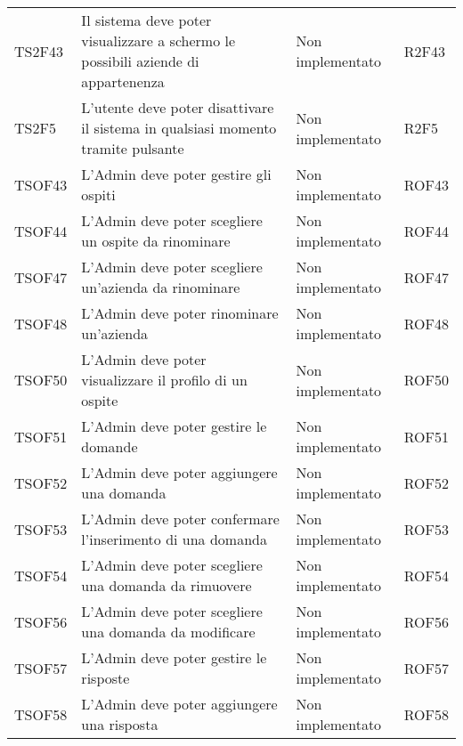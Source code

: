 \documentclass[../PianoDiQualifica.tex]{subfiles}
\begin{document}
\begin{longtable}[c] { >{\centering\arraybackslash}p{2cm} p{7cm} >{\centering\arraybackslash}p{4cm} >{\centering\arraybackslash}p{2cm}}
			\midrule
			\addlinespace[0.3em]
			TS2F43 & Il sistema deve poter visualizzare a schermo le possibili aziende di appartenenza & Non implementato & R2F43 \\ 
			\addlinespace[0.3em]
			\midrule
			\addlinespace[0.3em]
			TS2F5 & L'utente deve poter disattivare il sistema in qualsiasi momento tramite pulsante	 & Non implementato & R2F5 \\ 
			\addlinespace[0.3em]
			\midrule
			\addlinespace[0.3em]
			TSOF43 & L'Admin deve poter gestire gli ospiti & Non implementato & ROF43 \\ 
			\addlinespace[0.3em]
			\midrule
			\addlinespace[0.3em]
			TSOF44 & L'Admin deve poter scegliere un ospite da rinominare & Non implementato & ROF44 \\ 
			\addlinespace[0.3em]
			\midrule
			\addlinespace[0.3em]
			TSOF47 & L'Admin deve poter scegliere un'azienda da rinominare & Non implementato & ROF47 \\ 
			\addlinespace[0.3em]
			\midrule
			\addlinespace[0.3em]
			TSOF48 & L'Admin deve poter rinominare un'azienda & Non implementato & ROF48 \\ 
			\addlinespace[0.3em]
			\midrule
			\addlinespace[0.3em]
			TSOF50 & L'Admin deve poter visualizzare il profilo di un ospite & Non implementato & ROF50 \\ 
			\addlinespace[0.3em]
			\midrule
			\addlinespace[0.3em]
			TSOF51 & L'Admin deve poter gestire le domande & Non implementato & ROF51 \\ 
			\addlinespace[0.3em]
			\midrule
			\addlinespace[0.3em]
			TSOF52 & L'Admin deve poter aggiungere una domanda & Non implementato & ROF52 \\ 
			\addlinespace[0.3em]
			\midrule
			\addlinespace[0.3em]
			TSOF53 & L'Admin deve poter confermare l'inserimento di una domanda & Non implementato & ROF53 \\ 
			\addlinespace[0.3em]
			\midrule
			\addlinespace[0.3em]
			TSOF54 & L'Admin deve poter scegliere una domanda da rimuovere	 & Non implementato & ROF54 \\ 
			\addlinespace[0.3em]
			\midrule
			\addlinespace[0.3em]
			TSOF56 & L'Admin deve poter scegliere una domanda da modificare	 & Non implementato & ROF56 \\ 
			\addlinespace[0.3em]
			\midrule
			\addlinespace[0.3em]
			TSOF57 & L'Admin deve poter gestire le risposte & Non implementato & ROF57 \\
			\addlinespace[0.3em]
			\midrule
			\addlinespace[0.3em] 
			TSOF58 & L'Admin deve poter aggiungere una risposta & Non implementato & ROF58 \\ 

\end{longtable}
\end{document}
